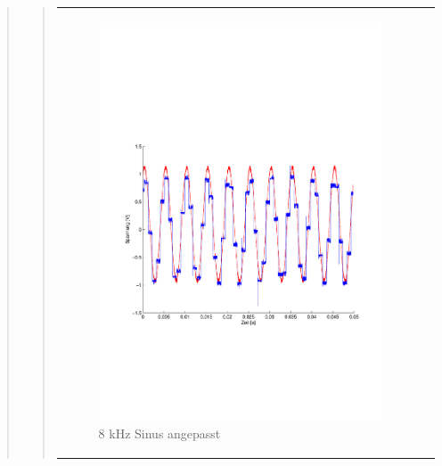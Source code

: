 \begin{quote}
\begin{quote}
\begin{center}
\begin{tabular}{ll}
                \begin{minipage}{0.6\textwidth}
                    \begin{figure}[H]
                        \includegraphics[scale=0.5, trim = 16mm 70mm 16mm 85mm, clip]
                                        {Bilder/8kHz_sin_Signal_Rekonstuiert_delayed}
                       \caption{8 kHz Sinus angepasst}
                      \label{fig:8kHz_sin_rek_angepasst}
                    \end{figure}
                \end{minipage}
            
            \end{tabular}
        \end{center}
        
        \vspace{2em}
        

\end{quote}
\end{quote}
